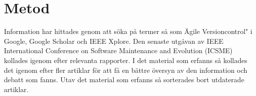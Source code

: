 \section{Metod}
\label{sec:bjorn-method}

Information har hittades genom att söka på termer så som \"Agile Versioncontrol" i Google, Google Scholar och IEEE Xplore. Den senaste utgåvan av IEEE International Conference on Software Maintenance and Evolution (ICSME) kollades igenom efter relevanta rapporter. I det material som erfanns så kollades det igenom efter fler artiklar för att få en bättre översyn av den information och debatt som fanns. Utav det material som erfanns så sorterades bort utdaterade artiklar.